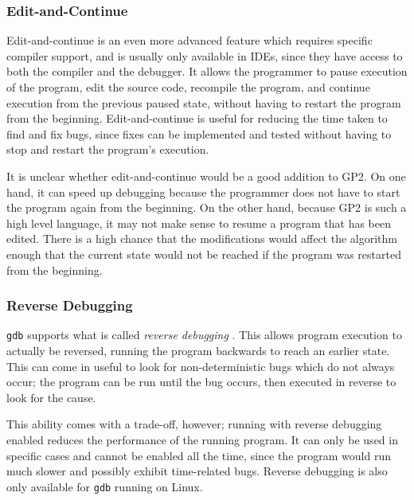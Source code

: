 \documentclass[authoryearcitations]{UoYCSproject}
\begin{document}

\subsubsection{Edit-and-Continue}
\label{sec:EditAndContinue}

Edit-and-continue is an even more advanced feature which requires specific
compiler support, and is usually only available in IDEs, since they have access
to both the compiler and the debugger. It allows the programmer to pause execution
of the program, edit the source code, recompile the program, and continue execution
from the previous paused state, without having to restart the program from the
beginning. Edit-and-continue is useful for reducing the time taken to find and
fix bugs, since fixes can be implemented and tested without having to stop and
restart the program's execution.

It is unclear whether edit-and-continue would be a good addition to GP2. On one
hand, it can speed up debugging because the programmer does not have to start the
program again from the beginning. On the other hand, because GP2 is such a high
level language, it may not make sense to resume a program that has been edited.
There is a high chance that the modifications would affect the algorithm enough
that the current state would not be reached if the program was restarted from
the beginning.


\subsubsection{Reverse Debugging}
\label{sec:ReverseDebugging}

\texttt{gdb} supports what is called \emph{reverse debugging} \citep{gdbreversesite}.
This allows program execution to actually be reversed, running the program
backwards to reach an earlier state. This can come in useful to look for
non-deterministic bugs which do not always occur; the program can be run until
the bug occurs, then executed in reverse to look for the cause.

This ability comes with a trade-off, however; running with reverse debugging
enabled reduces the performance of the running program. It can only be used in
specific cases and cannot be enabled all the time, since the program would run
much slower and possibly exhibit time-related bugs. Reverse debugging is also
only available for \texttt{gdb} running on Linux.
\end{document}
